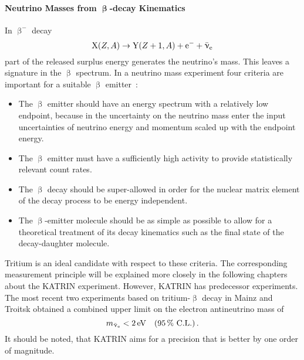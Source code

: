 \paragraph{Neutrino Masses from $\boldsymbol{\upbeta}$-decay Kinematics} 
In $\upbeta^-$ decay
\begin{equation}
    \ce{X}(Z,A) \rightarrow \ce{Y}(Z+1,A) + \ce{e^-} + \aeneutrino
\end{equation}
part of the released surplus energy generates the neutrino's mass. This leaves a signature in the $\upbeta$ spectrum. In a neutrino mass experiment four criteria  are important for a suitable $\upbeta$ emitter~\cite{Otten:2008zz}:
\begin{itemize}
	\item The $\upbeta$ emitter should have an energy spectrum with a relatively low endpoint, because in the uncertainty on the neutrino mass enter the input uncertainties of neutrino energy and	momentum scaled up with the endpoint energy.
	\item The $\upbeta$ emitter must have a sufficiently high activity to provide statistically relevant count rates.
	\item The $\upbeta$ decay should be super-allowed in order for the nuclear matrix element of the decay process to be energy independent.
	\item The $\upbeta$-emitter molecule should be as simple as possible to allow for a theoretical treatment of its decay kinematics such as the final state of the decay-daughter molecule.
\end{itemize}
Tritium is an ideal candidate with respect to these criteria\cite{Otten:2008zz}. The corresponding measurement principle will be explained more closely in the following chapters about the KATRIN experiment. However, KATRIN has predecessor experiments. The most recent two experiments based on tritium-$\upbeta$ decay in Mainz and Troitsk obtained a combined upper limit on the electron antineutrino mass of \cite{Kraus2005, Aseev:2011dq, ReviewOfParticlePhysics}
\begin{equation*}
    m_{\bar{\upnu}_{\mathrm{e}}} < \SI{2}{eV} \quad (\SI{95}{\percent} \text{ C.L.}) \text{\,.} 
\end{equation*}
It should be noted, that KATRIN aims for a precision that is better by one order of magnitude.
\FloatBarrier